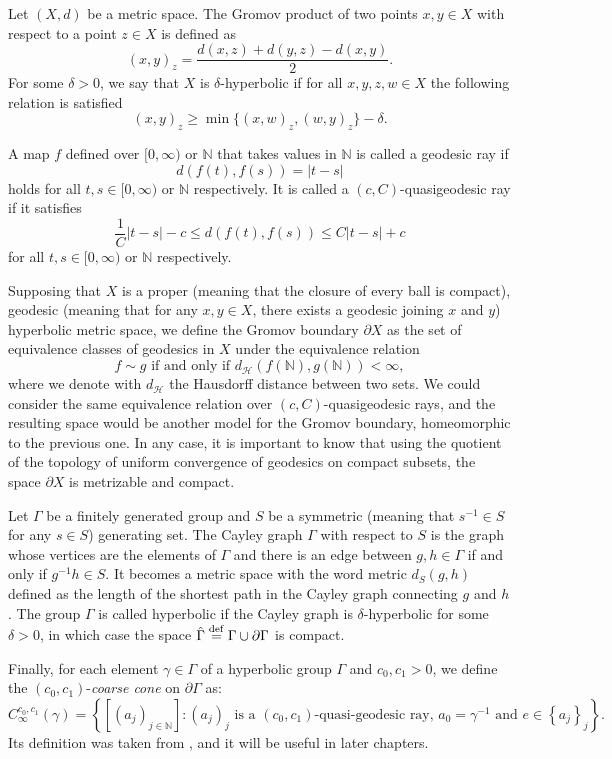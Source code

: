 \documentclass{report}
\begin{document}
Let $(X, d)$ be a metric space.
The Gromov product of two points $x, y \in X$ with respect to a point $z \in X$ is defined as
\[
(x, y)_z = \frac{d(x,z) + d(y,z) - d(x,y)}{2}.
\]
For some $\delta > 0$, we say that $X$ is $\delta$-hyperbolic if for all $x,y,z,w \in X$ the following relation is satisfied
\[
(x, y)_z \geq \min \{ (x, w)_z, (w, y)_z \} - \delta.
\]

A map $f$ defined over $[0, \infty)$ or $\mathbb N$ that takes values in $\mathbb N$ is called a geodesic ray if 
$$d(f(t), f(s)) = |t-s|$$
 holds for all $t, s \in \mathbb [0, \infty)$ or $\mathbb N$ respectively.
It is called a $(c, C)$-quasigeodesic ray if it satisfies 
$$\frac{1}{C}|t-s| - c \leq d(f(t), f(s)) \leq C|t-s| + c$$
for all $t, s \in \mathbb [0, \infty)$ or $\mathbb N$ respectively.

Supposing that $X$ is a proper (meaning that the closure of every ball is compact), geodesic (meaning that for any $x,y \in X$, there exists a geodesic joining $x$ and $y$) hyperbolic metric space, we define the Gromov boundary $\partial X$ as the set of equivalence classes of geodesics in $X$ under the equivalence relation
\[
f \sim g \text{ if and only if } d_{\mathcal H}(f(\mathbb N), g( \mathbb N )) < \infty,
\]
where we denote with $d_{\mathcal H}$ the Hausdorff distance between two sets.
We could consider the same equivalence relation over $(c,C)$-quasigeodesic rays, and the resulting space would be another model for the Gromov boundary, homeomorphic to the previous one. 
In any case, it is important to know that using the quotient of the topology of uniform convergence of geodesics on compact subsets, the space $\partial X$ is metrizable and compact.

Let $\Gamma$ be a finitely generated group and $S$ be a symmetric (meaning that $s^{-1} \in S$ for any $s \in S$) generating set.
The Cayley graph $\Gamma$ with respect to $S$ is the graph whose vertices are the elements of $\Gamma$ and there is an edge between $g, h \in \Gamma$ if and only if $g^{-1}h \in S$.
It becomes a metric space with the word metric $d_S(g,h)$ defined as the length of the shortest path in the Cayley graph connecting $g$ and $h$.
The group $\Gamma$ is called hyperbolic if the Cayley graph is $\delta$-hyperbolic for some $\delta > 0$, in which case the space $\hat \Gamma \overset{\mathrm{def}}{=} \Gamma \cup \partial \Gamma$ is compact.

Finally, for each element $\gamma \in \Gamma$ of a hyperbolic group $\Gamma$ and $c_0, c_1 > 0$, we define the $(c_0, c_1)$-\emph{coarse cone} on $\partial \Gamma$ as:
\[
C_{\infty}^{c_0, c_1}(\gamma) = \left\{ [(a_j)_{j \in \mathbb N}] : (a_j)_j \text{ is a } (c_0,c_1)\text{-quasi-geodesic ray, } a_0 = \gamma^{-1} \text{ and } e \in \left\{ a_j \right\}_{j} \right\}.
\]
Its definition was taken from \cite{pozzetti_anosov_2023}, and it will be useful in later chapters.
\end{document}
